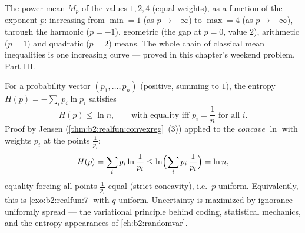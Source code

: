 \begin{omfigure}

{\small The power mean $M_p$ of the values $1, 2, 4$ (equal
weights), as a function of the exponent $p$: increasing from
$\min = 1$ (as $p \to -\infty$) to $\max = 4$ (as $p \to
+\infty$), through the harmonic ($p = -1$), geometric (the gap
at $p = 0$, value $2$), arithmetic ($p = 1$) and quadratic ($p
= 2$) means. The whole chain of classical mean inequalities is
one increasing curve --- proved in this chapter's weekend
problem, Part III.}
\end{omfigure}

\begin{example}\label{ex:b2:realfun:entropy}
For a probability vector $(p_1, \dots, p_n)$ (positive,
summing to $1$), the entropy $H(p) = -\sum_i p_i\ln p_i$
satisfies
\[
H(p) \leq \ln n ,
\qquad\text{with equality iff } p_i = \frac1n \text{ for all }
i .
\]
Proof by Jensen (\cref{thm:b2:realfun:convexreg}~(3)) applied to
the \emph{concave} $\ln$ with weights $p_i$ at the points
$\frac{1}{p_i}$:
\[
H(p) = \sum_i p_i\ln\frac{1}{p_i}
\leq \ln\Bigl(\sum_i p_i\,\frac1{p_i}\Bigr) = \ln n ,
\]
equality forcing all points $\frac1{p_i}$ equal (strict
concavity), i.e.\ $p$ uniform. Equivalently, this is
\cref{exo:b2:realfun:7} with $q$ uniform. Uncertainty is
maximized by ignorance uniformly spread --- the variational
principle behind coding, statistical mechanics, and the entropy
appearances of \cref{ch:b2:randomvar}.
\end{example}

